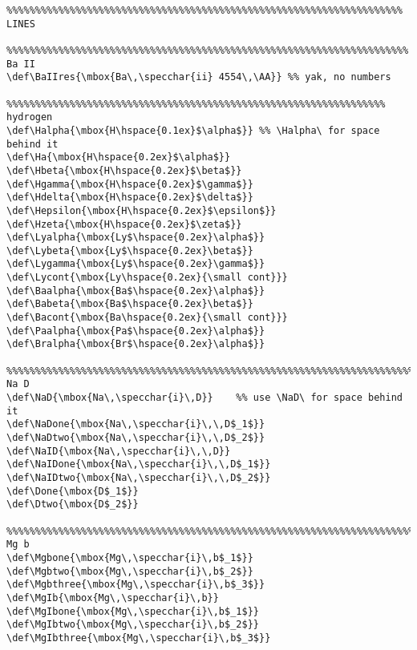 {\begin{verbatim}
%%%%%%%%%%%%%%%%%%%%%%%%%%%%%%%%%%%%%%%%%%%%%%%%%%%%%%%%%%%%%%%%%%%%% LINES

%%%%%%%%%%%%%%%%%%%%%%%%%%%%%%%%%%%%%%%%%%%%%%%%%%%%%%%%%%%%%%%%%%%%%% Ba II
\def\BaIIres{\mbox{Ba\,\specchar{ii} 4554\,\AA}} %% yak, no numbers

%%%%%%%%%%%%%%%%%%%%%%%%%%%%%%%%%%%%%%%%%%%%%%%%%%%%%%%%%%%%%%%%%% hydrogen
\def\Halpha{\mbox{H\hspace{0.1ex}$\alpha$}} %% \Halpha\ for space behind it
\def\Ha{\mbox{H\hspace{0.2ex}$\alpha$}}
\def\Hbeta{\mbox{H\hspace{0.2ex}$\beta$}}
\def\Hgamma{\mbox{H\hspace{0.2ex}$\gamma$}}
\def\Hdelta{\mbox{H\hspace{0.2ex}$\delta$}}
\def\Hepsilon{\mbox{H\hspace{0.2ex}$\epsilon$}}
\def\Hzeta{\mbox{H\hspace{0.2ex}$\zeta$}}
\def\Lyalpha{\mbox{Ly$\hspace{0.2ex}\alpha$}}
\def\Lybeta{\mbox{Ly$\hspace{0.2ex}\beta$}}
\def\Lygamma{\mbox{Ly$\hspace{0.2ex}\gamma$}}
\def\Lycont{\mbox{Ly\hspace{0.2ex}{\small cont}}}
\def\Baalpha{\mbox{Ba$\hspace{0.2ex}\alpha$}}
\def\Babeta{\mbox{Ba$\hspace{0.2ex}\beta$}}
\def\Bacont{\mbox{Ba\hspace{0.2ex}{\small cont}}}
\def\Paalpha{\mbox{Pa$\hspace{0.2ex}\alpha$}}
\def\Bralpha{\mbox{Br$\hspace{0.2ex}\alpha$}}

%%%%%%%%%%%%%%%%%%%%%%%%%%%%%%%%%%%%%%%%%%%%%%%%%%%%%%%%%%%%%%%%%%%%%%% Na D
\def\NaD{\mbox{Na\,\specchar{i}\,D}}    %% use \NaD\ for space behind it
\def\NaDone{\mbox{Na\,\specchar{i}\,\,D$_1$}}
\def\NaDtwo{\mbox{Na\,\specchar{i}\,\,D$_2$}}
\def\NaID{\mbox{Na\,\specchar{i}\,\,D}}
\def\NaIDone{\mbox{Na\,\specchar{i}\,\,D$_1$}}
\def\NaIDtwo{\mbox{Na\,\specchar{i}\,\,D$_2$}}
\def\Done{\mbox{D$_1$}}
\def\Dtwo{\mbox{D$_2$}}

%%%%%%%%%%%%%%%%%%%%%%%%%%%%%%%%%%%%%%%%%%%%%%%%%%%%%%%%%%%%%%%%%%%%%%% Mg b
\def\Mgbone{\mbox{Mg\,\specchar{i}\,b$_1$}}
\def\Mgbtwo{\mbox{Mg\,\specchar{i}\,b$_2$}}
\def\Mgbthree{\mbox{Mg\,\specchar{i}\,b$_3$}}
\def\MgIb{\mbox{Mg\,\specchar{i}\,b}}
\def\MgIbone{\mbox{Mg\,\specchar{i}\,b$_1$}}
\def\MgIbtwo{\mbox{Mg\,\specchar{i}\,b$_2$}}
\def\MgIbthree{\mbox{Mg\,\specchar{i}\,b$_3$}}


\end{verbatim}}

